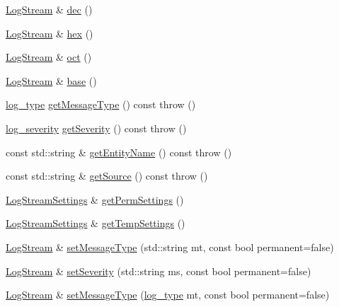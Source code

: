 \begin{DoxyCompactItemize}
\item 
\hyperlink{classkisscpp_1_1_log_stream}{Log\-Stream} \& \hyperlink{classkisscpp_1_1_log_stream_a8ed923f031fb6fd9c981d8c694c16a92}{dec} ()
\item 
\hyperlink{classkisscpp_1_1_log_stream}{Log\-Stream} \& \hyperlink{classkisscpp_1_1_log_stream_afdfaf9b54bf9ab3f95613fff8fe493a1}{hex} ()
\item 
\hyperlink{classkisscpp_1_1_log_stream}{Log\-Stream} \& \hyperlink{classkisscpp_1_1_log_stream_ab8f40d07bbf5dccf2a6c2033405dd2be}{oct} ()
\item 
\hyperlink{classkisscpp_1_1_log_stream}{Log\-Stream} \& \hyperlink{classkisscpp_1_1_log_stream_a857e9c930544fe22317b9be6a7d0d9ce}{base} ()
\item 
\hyperlink{namespacekisscpp_a18db16d1f4c281bec16e637c56b0cc88}{log\-\_\-type} \hyperlink{classkisscpp_1_1_log_stream_ac3448c21e8d5528907744ab2344b170f}{get\-Message\-Type} () const   throw ()
\item 
\hyperlink{namespacekisscpp_a2479a56cdedf21357ca5c68adc699d00}{log\-\_\-severity} \hyperlink{classkisscpp_1_1_log_stream_a8deec7dc1e77cdf99e99d8be56660151}{get\-Severity} () const   throw ()
\item 
const std\-::string \& \hyperlink{classkisscpp_1_1_log_stream_a37cf1aef25583d4544d149d5f2c7abe6}{get\-Entity\-Name} () const   throw ()
\item 
const std\-::string \& \hyperlink{classkisscpp_1_1_log_stream_a9c62fef30deb7557b7920580ab4a389a}{get\-Source} () const   throw ()
\item 
\hyperlink{classkisscpp_1_1_log_stream_settings}{Log\-Stream\-Settings} \& \hyperlink{classkisscpp_1_1_log_stream_a3b4c04dc683fdd8bcf54b3bdcb2906a0}{get\-Perm\-Settings} ()
\item 
\hyperlink{classkisscpp_1_1_log_stream_settings}{Log\-Stream\-Settings} \& \hyperlink{classkisscpp_1_1_log_stream_a7a5c468e5c33c028737a733c7510bc74}{get\-Temp\-Settings} ()
\item 
\hyperlink{classkisscpp_1_1_log_stream}{Log\-Stream} \& \hyperlink{classkisscpp_1_1_log_stream_ae71eea1ac14056104afb50c60740357f}{set\-Message\-Type} (std\-::string mt, const bool permanent=false)
\item 
\hyperlink{classkisscpp_1_1_log_stream}{Log\-Stream} \& \hyperlink{classkisscpp_1_1_log_stream_a7cf4acefb95c5bee8ec7fc1ae346dca3}{set\-Severity} (std\-::string ms, const bool permanent=false)
\item 
\hyperlink{classkisscpp_1_1_log_stream}{Log\-Stream} \& \hyperlink{classkisscpp_1_1_log_stream_accdbdc4d7876d4b1160321d0e49a4a24}{set\-Message\-Type} (\hyperlink{namespacekisscpp_a18db16d1f4c281bec16e637c56b0cc88}{log\-\_\-type} mt, const bool permanent=false)

\end{DoxyCompactItemize}
